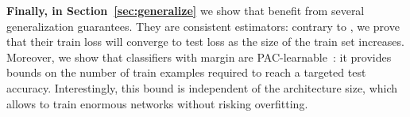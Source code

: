 \textbf{Finally, in Section~\ref{sec:generalize}} we show that \LipCl benefit from several generalization guarantees. They are consistent estimators: contrary to \LipInf, we prove that their train loss will converge to test loss as the size of the train set increases. Moreover, we show that \LipCl classifiers with margin are PAC-learnable~\cite{valiant1984theory}: it provides bounds on the number of train examples required to reach a targeted test accuracy. Interestingly, this bound is independent of the architecture size, which allows to train enormous \LipCl networks without risking overfitting.  


  
  


  
  

